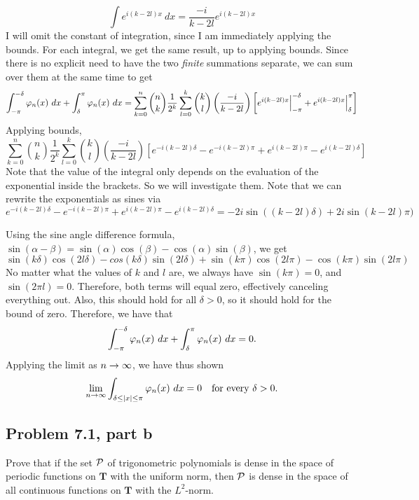 \begin{solution}
    \[\int e^{i(k - 2l)x} \ dx = \frac{-i}{k - 2l} e^{i(k - 2l)x}\]
    I will omit the constant of integration, since I am immediately applying the bounds. For each integral, we get the same result, up to applying bounds. Since there is no explicit need to have the two \textit{finite} summations separate, we can sum over them at the same time to get
    \[\int_{-\pi}^{-\delta} \varphi_n(x) \ dx + \int_{\delta}^\pi \varphi_n(x) \ dx = \sum_{k = 0}^n {n\choose k} \frac{1}{2^k}\sum_{l = 0}^k {k \choose l}\left(\frac{-i}{k - 2l}\right)\left[ e^{i(k - 2l)x}\Big|_{-\pi}^{-\delta} + e^{i(k - 2l)x}\Big|_{\delta}^\pi\right]\]
    Applying bounds, 
    \[ \sum_{k = 0}^n {n\choose k} \frac{1}{2^k}\sum_{l = 0}^k {k \choose l}\left(\frac{-i}{k - 2l}\right)\left[ e^{-i(k - 2l)\delta} - e^{-i(k - 2l)\pi} + e^{i(k - 2l)\pi} - e^{i(k - 2l)\delta} \right]\]
    Note that the value of the integral only depends on the evaluation of the exponential inside the brackets. So we will investigate them. Note that we can rewrite the exponentials as sines via
    \[e^{-i(k - 2l)\delta} - e^{-i(k - 2l)\pi} + e^{i(k - 2l)\pi} - e^{i(k - 2l)\delta} = -2i\sin((k -2l)\delta) +2i\sin(k - 2l)\pi)\]
    
    Using the sine angle difference formula, $\sin(\alpha -\beta) = \sin(\alpha)\cos(\beta) - \cos(\alpha)\sin(\beta)$, we get
    \[\sin(k\delta)\cos(2l\delta) - cos(k\delta)\sin(2l \delta) + \sin(k\pi)\cos(2l\pi) - \cos(k\pi) \sin(2l\pi)\]
    No matter what the values of $k$ and $l$ are, we always have $\sin(k\pi) = 0$, and $\sin(2\pi l) = 0$. Therefore, both terms will equal zero, effectively canceling everything out. Also, this should hold for all $\delta > 0$, so  it should hold for the bound of zero. Therefore, we have that 
    \[\int_{-\pi}^{-\delta} \varphi_n(x) \ dx + \int_{\delta}^\pi \varphi_n(x) \ dx = 0.\]
    Applying the limit as $n \rightarrow \infty$, we have thus shown  
    \[\lim_{n\rightarrow \infty} \int_{\delta \leq |x| \leq \pi} \varphi_n (x) \ dx = 0 \quad \text {for every } \delta > 0.\]
\end{solution}


\newpage
\subsection{Problem 7.1, part b}
Prove that if the set $\mathcal{P}$ of trigonometric polynomials is dense in the space of periodic functions on $\mathbf{T}$ with the uniform norm, then $\mathcal{P}$ is dense in the space of all continuous functions on $\mathbf{T}$ with the $L^2$-norm.
\partbreak
\begin{solution}


\end{solution}


